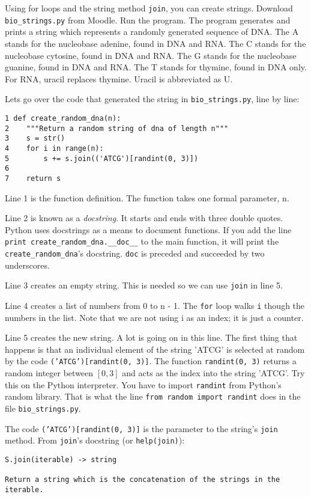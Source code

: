 \documentclass[12pt]{article}
\begin{document}
Using for loops and the string method \texttt{join}, you can create strings. Download \texttt{bio\_strings.py} from Moodle. Run the program. The program generates and prints a string which represents a randomly generated sequence of DNA. The A stands for the nucleobase adenine, found in DNA and RNA. The C stands for the nucleobase cytosine, found in DNA and RNA. The G stands for the nucleobase guanine, found in DNA and RNA. The T stands for thymine, found in DNA only. For RNA, uracil replaces thymine. Uracil is abbreviated as U. 

Lets go over the code that generated the string in \texttt{bio\_strings.py}, line by line:

\begin{verbatim}
1 def create_random_dna(n): 
2    """Return a random string of dna of length n""" 
3    s = str()
4    for i in range(n):
5        s += s.join(('ATCG')[randint(0, 3)])
6
7    return s
    \end{verbatim}

Line 1 is the function definition. The function takes one formal parameter, n.

Line 2 is known as a \emph{docstring}. It starts and ends with three double quotes. Python uses docstrings as a means to document functions. If you add the line \texttt{print create\_random\_dna.\_\_doc\_\_} to the main function, it will print the \texttt{create\_random\_dna}'s docstring. \texttt{doc} is preceded and succeeded by two underscores. 

Line 3 creates an empty string. This is needed so we can use \texttt{join} in line 5.

Line 4 creates a list of numbers from 0 to n - 1. The \texttt{for} loop walks \texttt{i} though the numbers in the list. Note that we are not using i as an index; it is just a counter. 

Line 5 creates the new string. A lot is going on in this line. The first thing that happens is that an individual element of the string 'ATCG' is selected at random by the code \texttt{('ATCG')[randint(0, 3)]}.  The function \texttt{randint(0, 3)} returns a random integer between $[0, 3]$ and acts as the index into the string 'ATCG'. Try this on the Python interpreter. You have to import \texttt{randint} from Python's random library. That is what the line \texttt{from random import randint} does in the file \texttt{bio\_strings.py}.

The code  \texttt{('ATCG')[randint(0, 3)]} is the parameter to the string's \texttt{join} method. From \texttt{join}'s docstring (or \texttt{help(join)}):
\begin{verbatim}
S.join(iterable) -> string 

Return a string which is the concatenation of the strings in the iterable.  
\end{verbatim}
\end{document}
